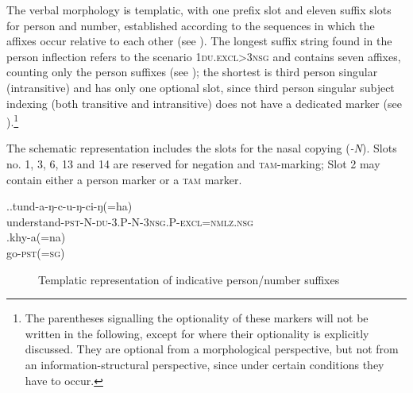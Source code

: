 The verbal morphology is  templatic, with one prefix slot and eleven suffix slots for person and number, established according to the sequences in which the affixes occur relative to each other (see ). The longest suffix string found in the person inflection refers to the scenario {\scshape 1du.excl>3nsg} and contains seven affixes,  counting only the person suffixes (see \Next[a]); the shortest is third person singular (intransitive) and has only one optional slot, since third person singular subject indexing (both transitive and intransitive) does not have a dedicated marker (see \Next[b]).\footnote{The parentheses signalling the optionality of these markers will not be written in the following, except for where their optionality is explicitly discussed. They are optional from a morphological perspective, but not from an information-structural perspective, since under certain conditions they have to occur.}

The schematic representation includes the slots for the nasal copying (\emph{-N}). Slots no. 1, 3, 6,  13 and 14 are reserved for negation and \textsc{tam}-marking; Slot 2 may contain either a person marker or a \textsc{tam} marker. 

\ex.\ag.tund-a-ŋ-c-u-ŋ-ci-ŋ(=ha)\\
understand{\scshape -pst-N-du-3.P-N-3nsg.P-excl=nmlz.nsg}\\
\bg.khy-a(=na)\\
go{\scshape -pst(=sg)}\\

\begin{figure}[htp]
\caption{Templatic representation of indicative person/number suffixes}\label{agr-list}
\end{figure} 



